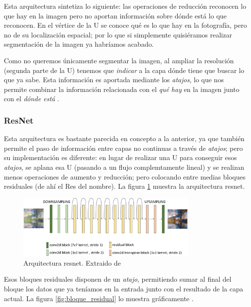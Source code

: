 \documentclass[../main.tex]{subfiles}
\begin{document}
Esta arquitectura sintetiza lo siguiente: las operaciones de reducción reconocen lo que hay en la imagen pero no aportan información sobre dónde está lo que reconocen. En el vértice de la U se conoce qué es lo que hay en la fotografía, pero no de su localización espacial; por lo que si simplemente quisiéramos realizar segmentación de la imagen ya habríamos acabado. \newline

Como no queremos únicamente segmentar la imagen, al ampliar la resolución (segunda parte de la U) tenemos que \textit{indicar} a la capa dónde tiene que buscar lo que ya sabe. Esta información es aportada mediante los \textit{atajos}, lo que nos permite combinar la información relacionada con el \textit{qué hay} en la imagen junto con el \textit{dónde está} \cite{Ronneberger2015} \cite{Foster2019}.

\subsubsection{ResNet}

Esta arquitectura es bastante parecida en concepto a la anterior, ya que también permite el paso de información entre capas no continuas a través de \textit{atajos}; pero su implementación es diferente: en lugar de realizar una U para conseguir esos \textit{atajos}, se aplana esa U (pasando a un flujo complemtamente lineal) y se realizan menos operaciones de aumento y reducción; pero colocando entre medias bloques residuales (de ahí el Res del nombre). La figura \ref{fig:resnet} muestra la arquitectura resnet.

\begin{figure}[h]
    \centering
    \includegraphics[width=0.8\textwidth]{imagenes/resnet.png}
    \caption[Arquitectura resnet]{Arquitectura resnet. Extraido de \cite{Foster2019}}
    \label{fig:resnet}
\end{figure}

Esos bloques residuales disponen de un \textit{atajo}, permitiendo sumar al final del bloque los datos que ya teníamos en la entrada junto con el resultado de la capa actual. La figura \ref{fig:bloque_residual} lo muestra gráficamente \cite{He2016} \cite{Foster2019}. 
\end{document}

